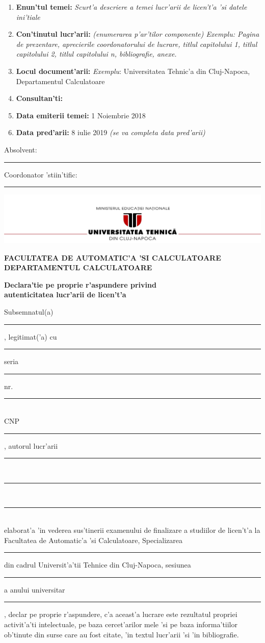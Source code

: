 \documentclass[12pt,a4paper,twoside]{report}
\newcommand{\department}{FACULTATEA DE AUTOMATIC'A 'SI CALCULATOARE\\
DEPARTAMENTUL CALCULATOARE}
\newcommand{\uline}[1]{\rule[0pt]{#1}{0.4pt}}
\newcommand{\utcnlogo}{\includegraphics[width=15cm]{img/utcn.jpg}}
\begin{document}
\vspace{1cm}

\begin{enumerate}
 \item {\bf Enun'tul temei:} {\it Scurt'a descriere a temei lucr'arii de licen't'a 'si datele ini'tiale}
\item {\bf Con'tinutul lucr'arii:} {\it (enumerarea p'ar'tilor componente) Exemplu: Pagina de prezentare, aprecierile coordonatorului de lucrare, titlul capitolului 1, titlul capitolului 2, titlul capitolului n, bibliografie, anexe.}
\item {\bf Locul document'arii:} {\it Exemplu}: Universitatea Tehnic'a din Cluj-Napoca, Departamentul Calculatoare
\item {\bf Consultan'ti:}
\item {\bf Data emiterii temei:} 1 Noiembrie 2018
\item {\bf Data pred'arii:} 8 iulie 2019 {\it (se va completa data pred'arii)}
  \end{enumerate}
\vspace{1.2cm}

\hspace{6cm} Absolvent: \uline{6cm} 

\vspace{0.5cm}
\hspace{6cm} Coordonator 'stiin'tific: \uline{5cm} 

\thispagestyle{empty}

\newpage

\begin{center}
\utcnlogo

{\bf \department}
\end{center}

\vspace{0.5cm}

\begin{center}
{\bf
Declara'tie pe proprie r'aspundere privind\\ 
autenticitatea lucr'arii de licen't'a}
\end{center}
\vspace{1cm}



Subsemnatul(a) \\
\uline{14.8cm}, 
legitimat('a) cu \uline{4cm} seria \uline{3cm} nr. \uline{4cm}\\
CNP \uline{9cm}, autorul lucr'arii \uline{2.8cm}\\
\uline{16cm}\\
\uline{16cm}\\
elaborat'a 'in vederea sus'tinerii examenului de finalizare a studiilor de licen't'a la Facultatea de Automatic'a 'si Calculatoare, Specializarea \uline{7cm} din cadrul Universit'a'tii Tehnice din Cluj-Napoca, sesiunea \uline{4cm} a anului universitar \uline{3cm}, declar pe proprie r'aspundere, c'a aceast'a lucrare este rezultatul propriei activit'a'ti intelectuale, pe baza cercet'arilor mele 'si pe baza informa'tiilor ob'tinute din surse care au fost citate, 'in textul lucr'arii 'si 'in bibliografie.
\end{document}

